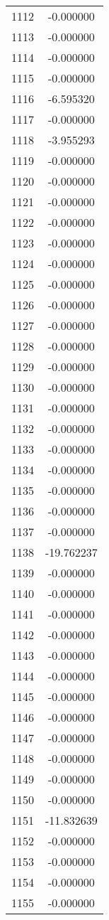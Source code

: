 \documentclass[12pt]{article}
\begin{document}
\begin{longtable}{@{}cc@{}}
1112 & -0.000000 \\
1113 & -0.000000 \\
1114 & -0.000000 \\
1115 & -0.000000 \\
1116 & -6.595320 \\
1117 & -0.000000 \\
1118 & -3.955293 \\
1119 & -0.000000 \\
1120 & -0.000000 \\
1121 & -0.000000 \\
1122 & -0.000000 \\
1123 & -0.000000 \\
1124 & -0.000000 \\
1125 & -0.000000 \\
1126 & -0.000000 \\
1127 & -0.000000 \\
1128 & -0.000000 \\
1129 & -0.000000 \\
1130 & -0.000000 \\
1131 & -0.000000 \\
1132 & -0.000000 \\
1133 & -0.000000 \\
1134 & -0.000000 \\
1135 & -0.000000 \\
1136 & -0.000000 \\
1137 & -0.000000 \\
1138 & -19.762237 \\
1139 & -0.000000 \\
1140 & -0.000000 \\
1141 & -0.000000 \\
1142 & -0.000000 \\
1143 & -0.000000 \\
1144 & -0.000000 \\
1145 & -0.000000 \\
1146 & -0.000000 \\
1147 & -0.000000 \\
1148 & -0.000000 \\
1149 & -0.000000 \\
1150 & -0.000000 \\
1151 & -11.832639 \\
1152 & -0.000000 \\
1153 & -0.000000 \\
1154 & -0.000000 \\
1155 & -0.000000 \\

\end{longtable}
\end{document}

